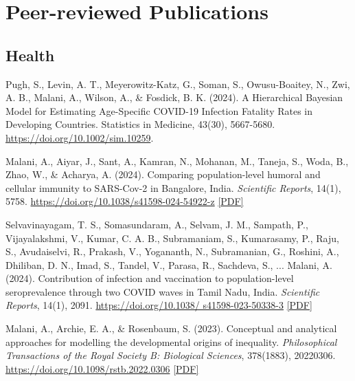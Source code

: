     \section*{Peer-reviewed Publications}

    \subsection*{Health}

    \begin{tablist}

        \item[2024] \tab{}Pugh, S., Levin, A. T., Meyerowitz-Katz, G., Soman, S., Owusu-Boaitey, N., Zwi, A. B., Malani, A., Wilson, A., \& Fosdick, B. K. (2024). A Hierarchical Bayesian Model for Estimating Age-Specific COVID-19 Infection Fatality Rates in Developing Countries. Statistics in Medicine, 43(30), 5667-5680. \href{https://doi.org/10.1002/sim.10259}{https://doi.org/10.1002/sim.10259}. 

        \item[2024] \tab{}Malani, A., Aiyar, J., Sant, A., Kamran, N., Mohanan, M., Taneja, S., Woda, B., Zhao, W., \& Acharya, A. (2024). Comparing population-level humoral and cellular immunity to SARS-Cov-2 in Bangalore, India. \textit{Scientific Reports}, 14(1), 5758. \href{https://doi.org/10.1038/s41598-024-54922-z}{https://doi.org/10.1038/s41598-024-54922-z} \href{https://github.com/anup-malani/website_personal/blob/main/publications/2024_MalaniEtAl_SciReports_CellullarImmunity.pdf}{[PDF]} 

        \item[2024] \tab{}Selvavinayagam, T. S., Somasundaram, A., Selvam, J. M., Sampath, P., Vijayalakshmi, V., Kumar, C. A. B., Subramaniam, S., Kumarasamy, P., Raju, S., Avudaiselvi, R., Prakash, V., Yogananth, N., Subramanian, G., Roshini, A., Dhiliban, D. N., Imad, S., Tandel, V., Parasa, R., Sachdeva, S., ... Malani, A. (2024). Contribution of infection and vaccination to population-level seroprevalence through two COVID waves in Tamil Nadu, India. \textit{Scientific Reports}, 14(1), 2091. \href{https://doi.org/10.1038/s41598-023-50338-3}{https://doi.org/10.1038/ s41598-023-50338-3} \href{https://github.com/anup-malani/website_personal/blob/main/publications/2024_SelvavinayagamMalaniEtAl_SciReports_TamilNaduSero.pdf}{[PDF]}
        
        \item[2023] \tab{}Malani, A., Archie, E. A., \& Rosenbaum, S. (2023). Conceptual and analytical approaches for modelling the developmental origins of inequality. \textit{Philosophical Transactions of the Royal Society B: Biological Sciences}, 378(1883), 20220306. \href{https://doi.org/10.1098/rstb.2022.0306}{https://doi.org/10.1098/rstb.2022.0306} \href{https://github.com/anup-malani/website_personal/blob/main/publications/2023_MalaniEtAl_PhilTrans_DevtOrigins.pdf}{[PDF]}
        

\end{tablist}
